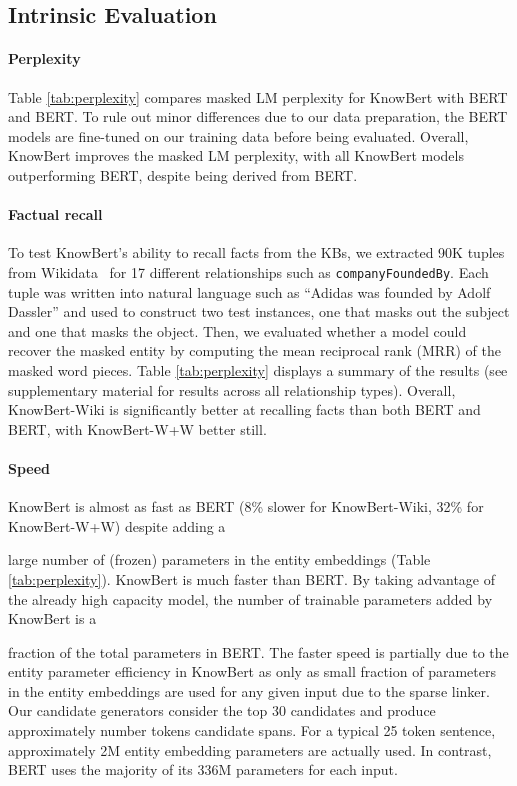 \documentclass[11pt,a4paper]{article}
\newcommand{\reword}[2]{\textcolor{orange}{#2\sout{#1}}}
\renewcommand{\reword}[2]{#2}
\newcommand{\KB}[0]{KnowBert}
\newcommand{\KBS}[0]{KnowBert }
\newcommand{\KWIKI}[0]{KnowBert-Wiki}
\newcommand{\KWANDW}[0]{KnowBert-W+W}
\newcommand{\KWIKIS}[0]{KnowBert-Wiki }
\newcommand{\KWANDWS}[0]{KnowBert-W+W }
\newcommand{\BBS}[0]{BERT }
\newcommand{\BB}[0]{BERT}
\newcommand{\BLS}[0]{BERT }
\newcommand{\BL}[0]{BERT}
\begin{document}
\subsection{Intrinsic Evaluation}
\reword{
This section presents intrinsic evaluations of \KB: perplexity, speed, ability to recall facts, and results on the integrated entity linkers.
}
{}
\paragraph{Perplexity}
Table \ref{tab:perplexity} compares masked LM perplexity for \KBS with \BBS and \BL.
To rule out minor differences due to our data preparation, the BERT models are fine-tuned on our training data before being evaluated.
Overall, \KBS improves the masked LM perplexity, with all \KBS models 
\reword{having perplexity lower than}{outperforming}
\BL, despite being derived from \BB.


\paragraph{Factual recall} To test \KB's ability to recall facts from the KBs, we extracted 90K tuples from Wikidata~\cite{Vrandecic:2014:WFC:2661061.2629489} for 17 different relationships such as \texttt{companyFoundedBy}.
Each tuple was written into natural language such as ``Adidas was founded by Adolf Dassler'' and used to construct two test instances, one that masks out the subject and one that masks the object.
Then, we evaluated whether a model could recover the masked entity by computing the mean reciprocal rank (MRR) of the masked word pieces.
Table \ref{tab:perplexity} displays a summary of the results (see supplementary material for results across all relationship types).
Overall, \KWIKIS is significantly better at recalling facts than both \BBS and \BL, with \KWANDWS better still.  



\paragraph{Speed} \KBS is almost as fast as \BBS (8\% slower for \KWIKI, 32\% for \KWANDW) despite adding a 
\reword{very}{}
large number of (frozen) parameters in the entity embeddings (Table \ref{tab:perplexity}).  \KBS is much faster than \BL.
By taking advantage of the already high capacity model, the number of trainable parameters added by \KBS is a 
\reword{small}{} 
fraction of the total parameters in BERT.
The faster speed is partially due to the entity parameter efficiency in \KBS as only as small fraction of parameters in the entity embeddings are used for any given input due to the sparse linker.
Our candidate generators consider the top 30 candidates and produce approximately number tokens candidate spans.  For a typical 25 token sentence, approximately 2M entity embedding parameters are actually used.  In contrast, \BLS uses the majority of its 336M parameters for each input.
\end{document}
